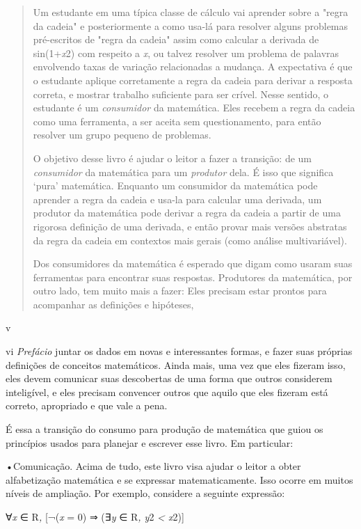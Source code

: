 \documentclass[
]{article}
\begin{document}
\begin{quote}
Um estudante em uma típica classe de cálculo vai aprender sobre a "regra
da cadeia" e posteriormente a como usa-lá para resolver alguns problemas
pré-escritos de "regra da cadeia" assim como calcular a derivada de
sin(1+\emph{x}2) com respeito a \emph{x}, ou talvez resolver um problema
de palavras envolvendo taxas de variação relacionadas a mudança. A
expectativa é que o estudante aplique corretamente a regra da cadeia
para derivar a resposta correta, e mostrar trabalho suficiente para ser
crível. Nesse sentido, o estudante é um \emph{consumidor} da matemática.
Eles recebem a regra da cadeia como uma ferramenta, a ser aceita sem
questionamento, para então resolver um grupo pequeno de problemas.

O objetivo desse livro é ajudar o leitor a fazer a transição: de um
\emph{consumidor} da matemática para um \emph{produtor} dela. É isso que
significa `pura' matemática. Enquanto um consumidor da matemática pode
aprender a regra da cadeia e usa-la para calcular uma derivada, um
produtor da matemática pode derivar a regra da cadeia a partir de uma
rigorosa definição de uma derivada, e então provar mais versões
abstratas da regra da cadeia em contextos mais gerais (como análise
multivariável).

Dos consumidores da matemática é esperado que digam como usaram suas
ferramentas para encontrar suas respostas. Produtores da matemática, por
outro lado, tem muito mais a fazer: Eles precisam estar prontos para
acompanhar as definições e hipóteses,
\end{quote}

v

vi \emph{Prefácio} juntar os dados em novas e interessantes formas, e
fazer suas próprias definições de conceitos matemáticos. Ainda mais, uma
vez que eles fizeram isso, eles devem comunicar suas descobertas de uma
forma que outros considerem inteligível, e eles precisam convencer
outros que aquilo que eles fizeram está correto, apropriado e que vale a
pena.

É essa a transição do consumo para produção de matemática que guiou os
princípios usados para planejar e escrever esse livro. Em particular:

•Comunicação. Acima de tudo, este livro visa ajudar o leitor a obter
alfabetização matemática e se expressar matematicamente. Isso ocorre em
muitos níveis de ampliação. Por exemplo, considere a seguinte expressão:

∀\emph{x} ∈ R\emph{,} {[}¬(\emph{x} = 0) ⇒ (∃\emph{y} ∈ R\emph{, y}2
\emph{\textless{} x}2){]}
\end{document}
